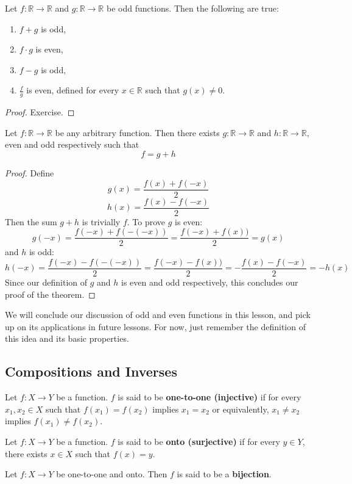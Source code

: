 \documentclass[11pt]{article}
\numberwithin{lemma}{section}
\numberwithin{equation}{section}
\numberwithin{define}{section}
\numberwithin{prop}{section}
\numberwithin{figure}{section}
\numberwithin{theorem}{section}
\newcounter{ex}[section]
\numberwithin{ex}{section}
\def\real{\mathbb{R}}
\begin{document}
\begin{theorem}
	\label{thm:oo}
	Let $f:\real\to\real$ and $g:\real\to\real$ be odd functions. Then the following are true:
	\begin{enumerate}
		\item $f+g$ is odd,
		\item $f\cdot g$ is even,
		\item $f-g$ is odd,
		\item $\frac{f}{g}$ is even, defined for every $x\in \real$ such that $g(x)\neq0$. 
	\end{enumerate}
\end{theorem}
\begin{proof}
	Exercise.
\end{proof}

\begin{theorem}
	Let $f:\real\to\real$ be any arbitrary function. Then there exists $g:\real\to\real$ and $h:\real\to\real$, even and odd respectively such that
	$$f=g+h$$
\end{theorem}
\begin{proof}
	Define
	$$g(x)=\frac{f(x)+f(-x)}{2}$$
	$$h(x)=\frac{f(x)-f(-x)}{2}$$
	Then the sum $g+h$ is trivially $f$. 
	To prove $g$ is even:
	$$g(-x)=\frac{f(-x)+f(-(-x))}{2}=\frac{f(-x)+f(x))}{2}=g(x)$$
	and $h$ is odd:
	$$h(-x)=\frac{f(-x)-f(-(-x))}{2}=\frac{f(-x)-f(x))}{2}=-\frac{f(x)-f(-x)}{2}=-h(x)$$
	Since our definition of $g$ and $h$ is even and odd respectively, this concludes our proof of the theorem. 
\end{proof}

We will conclude our discussion of odd and even functions in this lesson, and pick up on its applications in future lessons. For now, just remember the definition of this idea and its basic properties. 

\subsection{Compositions and Inverses}
\begin{define}
	Let $f:X\to Y$ be a function. $f$ is said to be \textbf{one-to-one (injective)} if for every $x_1,x_2\in X$ such that $f(x_1)=f(x_2)$ implies $x_1=x_2$ or equivalently, $x_1\neq x_2$ implies $f(x_1)\neq f(x_2)$.
\end{define}
\begin{define}
	Let $f:X\to Y$ be a function. $f$ is said to be \textbf{onto (surjective)} if for every $y\in Y$, there exists $x\in X$ such that $f(x)=y$.
\end{define}
\begin{define}
Let $f:X\to Y$ be one-to-one and onto. Then $f$ is said to be a \textbf{bijection}.	
\end{define}
\end{document}
